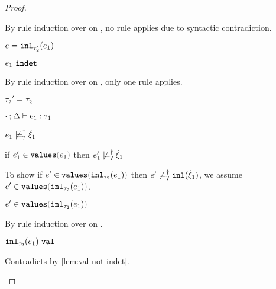 \begin{proof}
\begin{byCases}
\begin{byCases}
        By rule induction over  on , no rule applies due to syntactic contradiction.
        \item[\text{(\ref{rule:IInl})}] 
        \begin{pfsteps*}
        \item $e=\mathtt{inl}_{\tau_2'}({e_1})$ 
        \item $e_1 ~\mathtt{indet}$  
        \end{pfsteps*} 
        By rule induction over  on , only one rule applies.
        \begin{byCases}
          \item[\text{(\ref{rule:TInl})}]
          \begin{pfsteps*}
          \item $\tau_2'=\tau_2$ 
          \item $\cdot \mathbin{;} \Delta \vdash e_1 : \tau_1$  
          \item $e_1 \not\models_{?}^{\dag} \dot{\xi}_1$  
          \item if $\inValues{e_1'}{e_1}$ then $e_1' \not\models_{?}^{\dag} \dot{\xi}_1$  
          \end{pfsteps*} 
          To show if $\inValues{e'}{\hinl{\tau_2}{e_1}}$ then $e' \not\models_{?}^{\dag} \mathtt{inl}(\dot{\xi}_1)$, we assume $\inValues{e'}{\hinl{\tau_2}{e_1}}$.
          \begin{pfsteps*}
          \item $\inValues{e'}{\hinl{\tau_2}{e_1}}$  
          \end{pfsteps*}
          By rule induction over  on .
          \begin{byCases}
            \item[\text{(\ref{rule:IVVal})}]
            \begin{pfsteps*}
            \item $\mathtt{inl}_{\tau_2}({e_1}) ~\mathtt{val}$ 
            \end{pfsteps*} 
            Contradicts  by \autoref{lem:val-not-indet}.

\end{byCases}
\end{byCases}
\end{byCases}
\end{byCases}
\end{proof}
